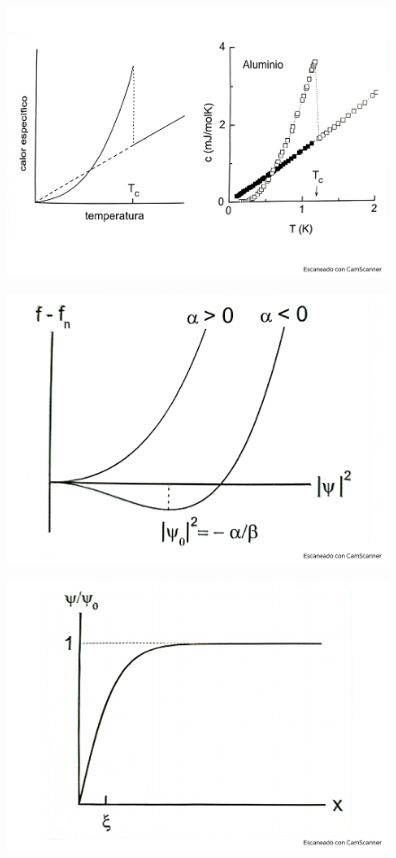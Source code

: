 \begin{figure}[h!] \centering
	\includegraphics[scale=0.5]{Cuerpo/Ch_11/Fotos libro 8.pdf}
	\caption{}
	\label{Fig:11-08}
\end{figure}
\begin{figure}[h!] \centering
	\includegraphics[scale=0.5]{Cuerpo/Ch_11/Fotos libro 9.pdf}
	\caption{}
	\label{Fig:11-09}
\end{figure}
\begin{figure}[h!] \centering
	\includegraphics[scale=0.5]{Cuerpo/Ch_11/Fotos libro 10.pdf}
	\caption{}
	\label{Fig:11-10}
\end{figure}
